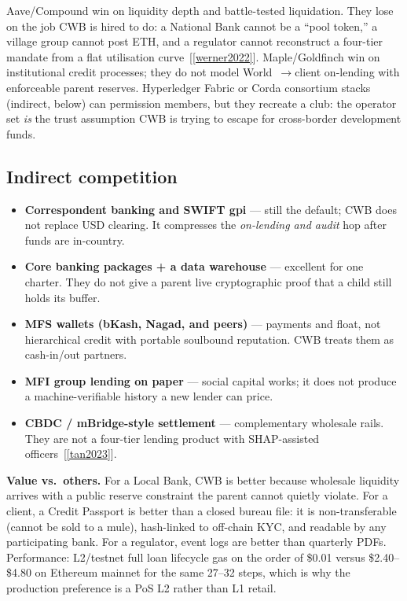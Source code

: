 \documentclass[11pt,a4paper]{article}
\newcommand{\rcite}[1]{[\ref{#1}]}
\begin{document}
Aave/Compound win on liquidity depth and battle-tested liquidation. They lose on the job CWB is hired to do: a National Bank cannot be a ``pool token,'' a village group cannot post ETH, and a regulator cannot reconstruct a four-tier mandate from a flat utilisation curve~\rcite{werner2022}. Maple/Goldfinch win on institutional credit processes; they do not model World~$\to$client on-lending with enforceable parent reserves. Hyperledger Fabric or Corda consortium stacks (indirect, below) can permission members, but they recreate a club: the operator set \textit{is} the trust assumption CWB is trying to escape for cross-border development funds.

\subsection{Indirect competition}

\begin{itemize}
  \item \textbf{Correspondent banking and SWIFT gpi} --- still the default; CWB does not replace USD clearing. It compresses the \textit{on-lending and audit} hop after funds are in-country.
  \item \textbf{Core banking packages + a data warehouse} --- excellent for one charter. They do not give a parent live cryptographic proof that a child still holds its buffer.
  \item \textbf{MFS wallets (bKash, Nagad, and peers)} --- payments and float, not hierarchical credit with portable soulbound reputation. CWB treats them as cash-in/out partners.
  \item \textbf{MFI group lending on paper} --- social capital works; it does not produce a machine-verifiable history a new lender can price.
  \item \textbf{CBDC / mBridge-style settlement} --- complementary wholesale rails. They are not a four-tier lending product with SHAP-assisted officers~\rcite{tan2023}.
\end{itemize}

\textbf{Value vs.\ others.} For a Local Bank, CWB is better because wholesale liquidity arrives with a public reserve constraint the parent cannot quietly violate. For a client, a Credit Passport is better than a closed bureau file: it is non-transferable (cannot be sold to a mule), hash-linked to off-chain KYC, and readable by any participating bank. For a regulator, event logs are better than quarterly PDFs. Performance: L2/testnet full loan lifecycle gas on the order of \$0.01 versus \$2.40--\$4.80 on Ethereum mainnet for the same 27--32 steps, which is why the production preference is a PoS L2 rather than L1 retail.
\end{document}
